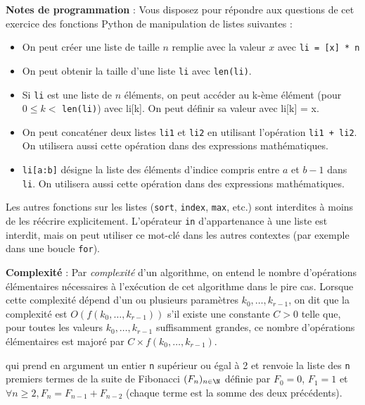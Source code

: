 \documentclass[11pt,a4paper]{article}
\begin{document}
\begin{Exercise}[title={Programmes divers et saut de taille maximale},origin={\bac \; d'après {\sc CAPES 2023} (Partie 1)}]

\medskip
\textbf{Notes de programmation }: Vous disposez pour répondre aux questions de cet exercice des fonctions Python de manipulation de listes  suivantes :
\begin{itemize}
	\item[\textbullet] On peut créer une liste de taille $n$ remplie avec la valeur $x$ avec {\tt li = [x] * n}
	\item[\textbullet] On peut obtenir la taille d'une liste {\tt li} avec {\tt len(li)}.
	\item[\textbullet] Si {\tt li} est une liste de $n$ éléments, on peut accéder au k-ème élément (pour $0 \leq k <$ {\tt len(li)}) avec { li[k]}. On peut définir sa valeur avec {li[k] = x}.
	\item[\textbullet] On peut concaténer deux listes {\tt li1} et {\tt li2} en utilisant l'opération {\tt li1 + li2}. On utilisera aussi cette opération dans des expressions mathématiques.
	\item[\textbullet] {\tt li[a:b]} désigne la liste des éléments d'indice compris entre $a$ et $b-1$ dans {\tt li}. On utilisera aussi cette opération dans des expressions mathématiques.
\end{itemize}

Les autres fonctions sur les listes ({\tt sort}, {\tt index}, {\tt max}, etc.) sont interdites à moins de les réécrire explicitement. L'opérateur {\tt in} d'appartenance à une liste est interdit, mais on peut utiliser ce mot-clé dans les autres contextes (par exemple dans une boucle {\tt for}).

\medskip
\textbf{Complexité} : Par \textit{complexité} d'un algorithme, on entend le nombre d'opérations élémentaires nécessaires à l'exécution de cet algorithme dans le pire cas. Lorsque cette complexité dépend d'un ou plusieurs paramètres $k_0, \dots, k_{r-1}$, on dit que la complexité est $O\left( f(k_0,\dots,k_{r-1}) \right)$ s'il existe une constante $C>0$ telle que, pour toutes les valeurs $k_0, \dots, k_{r-1}$ suffisamment grandes, ce nombre d'opérations élémentaires est majoré par $C \times f(k_0, \dots, k_{r-1})$.

\medskip
\ExePart[name = Programmes divers]

 qui prend en argument un entier {\tt n} supérieur ou égal à 2 et renvoie la liste des {\tt n} premiers termes de la suite de Fibonacci $(F_n)_{n \in \N}$ définie par $F_0=0$, $F_1 = 1$ et $\forall n\geq 2, F_n = F_{n-1} + F_{n-2}$ (chaque terme est la somme des deux précédents).


\end{Exercise}
\end{document}
